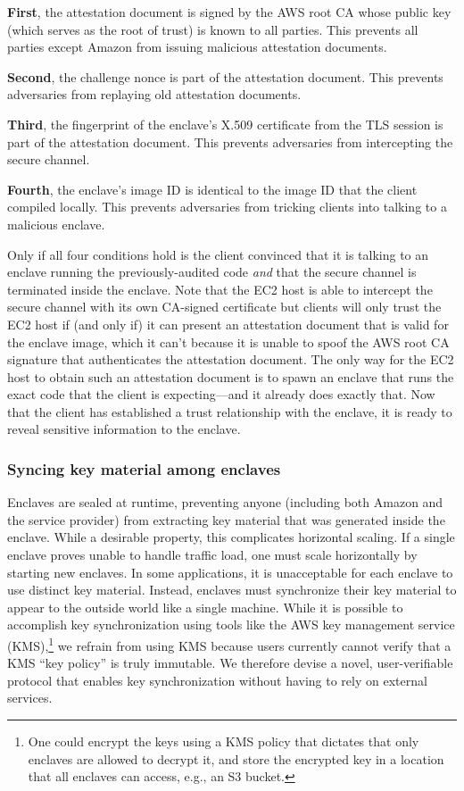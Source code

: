 {\bf First}, the attestation document is signed by the AWS root CA whose public
key (which serves as the root of trust) is known to all parties.  This prevents
all parties except Amazon from issuing malicious attestation documents.

{\bf Second}, the challenge nonce is part of the attestation document.  This
prevents adversaries from replaying old attestation documents.

{\bf Third}, the fingerprint of the enclave's X.509 certificate from the TLS
session is part of the attestation document.  This prevents adversaries from
intercepting the secure channel.

{\bf Fourth}, the enclave's image ID is identical to the image ID that the
client compiled locally.  This prevents adversaries from tricking clients into
talking to a malicious enclave.

Only if all four conditions hold is the client convinced that it is talking to
an enclave running the previously-audited code \emph{and} that the secure
channel is terminated inside the enclave.  Note that the EC2 host is able to
intercept the secure channel with its own CA-signed certificate but clients will
only trust the EC2 host if (and only if) it can present an attestation document
that is valid for the enclave image, which it can't because it is unable to
spoof the AWS root CA signature that authenticates the attestation document.
The only way for the EC2 host to obtain such an attestation document is to spawn
an enclave that runs the exact code that the client is expecting---and it
already does exactly that.  Now that the client has established a trust
relationship with the enclave, it is ready to reveal sensitive information to
the enclave.

\subsubsection{Syncing key material among enclaves}%
\label{sec:sync}

Enclaves are sealed at runtime, preventing anyone (including both Amazon and the
service provider) from extracting key material that was generated inside the
enclave.  While a desirable property, this complicates horizontal scaling.  If a
single enclave proves unable to handle traffic load, one must scale horizontally
by starting new enclaves.  In some applications, it is unacceptable for each
enclave to use distinct key material.  Instead, enclaves must synchronize their
key material to appear to the outside world like a single machine.  While it is
possible to accomplish key synchronization using tools like the AWS key
management service (KMS),\footnote{One could encrypt the keys using a KMS policy
that dictates that only enclaves are allowed to decrypt it, and store the
encrypted key in a location that all enclaves can access, e.g., an S3 bucket.}
we refrain from using KMS because users currently cannot verify that a
KMS ``key policy'' is truly immutable.  We therefore devise a novel,
user-verifiable protocol that enables key synchronization without having to rely
on external services.

